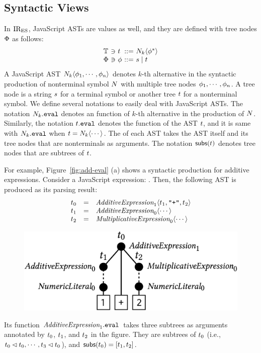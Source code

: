 \subsection{Syntactic Views}\label{sec:view}

In $\text{IR}_\text{ES}$, JavaScript ASTs are values as well, and they are defined with tree
nodes $\Phi$ as follows:
\[
  \begin{array}{l@{~}c@{~}l@{~}c@{~}l}
    \treeset &\ni& \tree &::=& \nt_k \langle \node^* \rangle\\
    \nodeset &\ni& \node &::=& \str \mid \tree\\
  \end{array}
\]
A JavaScript AST $N_k \langle \phi_1, \cdots, \phi_n \rangle$ denotes $k$-th
alternative in the syntactic production of nonterminal symbol $N$ with
multiple tree nodes $\phi_1, \cdots, \phi_n$.  A tree node is a string $s$
for a terminal symbol or another tree $t$ for a nonterminal symbol. We
define several notations to easily deal with JavaScript ASTs.  The notation
$\nt_k.\eval$ denotes an  function of $k$-th alternative in
the production of $N$.  Similarly, the notation $\tree.\eval$ denotes the
 function of the AST $t$, and it is same with
$\nt_k.\eval$ when $t = N_k \langle \cdots \rangle$. The
 of each AST takes the AST itself and its tree nodes that are
nonterminals as arguments.  The notation $\textsf{subs}(t)$ denotes tree nodes
that are subtrees of $t$.

For example, Figure~\ref{fig:add-eval} (a) shows a syntactic production for
additive expressions.  Consider a JavaScript expression: .  Then,
the following AST is produced as its parsing result:
\[
  \begin{array}{lcl}
    \tree_0 &=&
    \essyn{AdditiveExpression}_1 \langle \tree_1, \code{"+"}, \tree_2 \rangle\\

    \tree_1 &=&
    \essyn{AdditiveExpression}_0 \langle \cdots \rangle\\

    \tree_2 &=&
    \essyn{MultiplicativeExpression}_0 \langle \cdots \rangle\\
  \end{array}
\]
\begin{figure}[H]
  \vspace*{-1em}
  \includegraphics[width=.7\columnwidth]{img/add-ast.png}
  \vspace*{-1em}
\end{figure}
\noindent Its  function $\essyn{AdditiveExpression}_1.\eval$
takes three subtrees as arguments annotated by $t_0$, $t_1$, and
$t_2$ in the figure. They are subtrees of $t_0$ (i.e., $t_0 \lhd
t_0, \cdots, t_3 \lhd t_0$), and $\textsf{subs}(t_0) = [t_1,
t_2]$.


